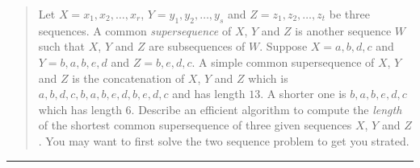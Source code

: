\documentclass[11pt]{article}
\begin{document}

\begin{quote}
Let $X = x_1,x_2,\ldots,x_r$, $Y = y_1,y_2,\ldots,y_s$ and $Z =
  z_1,z_2,\ldots,z_t$ be three sequences. A common {\em supersequence}
  of $X$, $Y$ and $Z$ is another sequence $W$ such that $X$, $Y$ and $Z$
  are subsequences of $W$. Suppose $X = a,b,d,c$ and $Y = b,a,b,e,d$ and $Z =
  b, e, d, c$. A simple common supersequence of $X$, $Y$ and $Z$ is
  the concatenation of $X$, $Y$ and $Z$ which is
  $a,b,d,c,b,a,b,e,d,b,e,d,c$ and has length $13$. A shorter one is
  $b, a, b, e, d, c$ which has length $6$.  Describe an efficient
  algorithm to compute the {\em length} of the shortest common
  supersequence of three given sequences $X$, $Y$ and $Z$. You may want to
  first solve the two sequence problem to get you strated.
\end{quote}
\hrule
\end{document}
